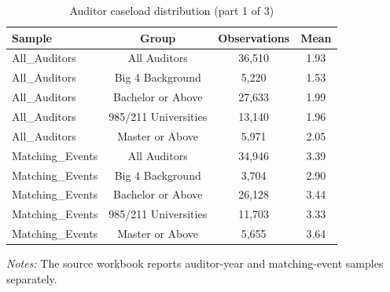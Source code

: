 \begin{table}[htbp]
\footnotesize
\centering
\caption{Auditor caseload distribution (part 1 of 3)}
\begin{threeparttable}
\begin{tabular}{p{}ccc}
\toprule
Sample & Group & Observations & Mean \\
\midrule
All\_Auditors & All Auditors & 36,510 & 1.93 \\
All\_Auditors & Big 4 Background & 5,220 & 1.53 \\
All\_Auditors & Bachelor or Above & 27,633 & 1.99 \\
All\_Auditors & 985/211 Universities & 13,140 & 1.96 \\
All\_Auditors & Master or Above & 5,971 & 2.05 \\
Matching\_Events & All Auditors & 34,946 & 3.39 \\
Matching\_Events & Big 4 Background & 3,704 & 2.90 \\
Matching\_Events & Bachelor or Above & 26,128 & 3.44 \\
Matching\_Events & 985/211 Universities & 11,703 & 3.33 \\
Matching\_Events & Master or Above & 5,655 & 3.64 \\
\bottomrule
\end{tabular}
\begin{tablenotes}\footnotesize
\item \raggedright \textit{Notes:} The source workbook reports auditor-year and matching-event samples separately.
\end{tablenotes}
\end{threeparttable}
\end{table}

